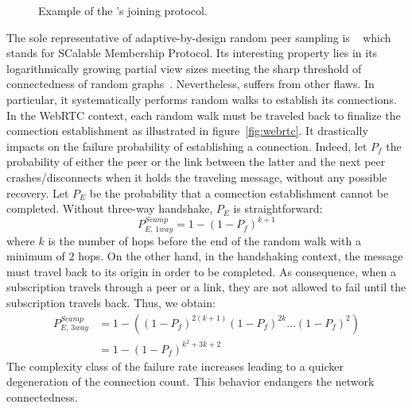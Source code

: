\begin{figure*}
  \centering
  \hspace{8pt}
  \hspace{8pt}
  \caption{\label{fig:joiningexample}Example of the \SPRAY's joining
    protocol.}
\end{figure*}


The sole representative of adaptive-by-design random peer sampling is
\SCAMP~\cite{ganesh2001scamp,ganesh2003peer} which stands for
SCalable Membership Protocol. Its interesting property lies in its
logarithmically growing partial view sizes meeting the sharp threshold
of connectedness of random
graphs~\cite{erdos1959random}. Nevertheless, \SCAMP suffers from
other flaws. In particular, it systematically performs random walks to
establish its connections. In the WebRTC context, each random walk
must be traveled back to finalize the connection establishment as
illustrated in figure~\ref{fig:webrtc}. It drastically impacts on the
\SCAMP failure probability of establishing a connection. Indeed, let
$P_f$ the probability of either the peer or the link between the
latter and the next peer crashes/disconnects when it holds the
traveling message, without any possible recovery. Let $P_E$ be the
probability that a connection establishment cannot be
completed. Without three-way handshake, $P_E$ is straightforward:
\begin{equation} P_{E,\,1way}^{Scamp}=1-(1- P_f)^{k+1} \end{equation} where $k$
is the number of hops before the end of the random walk with a minimum of $2$
hops. On the other hand, in the handshaking context, the message must travel
back to its origin in order to be completed. As consequence, when a
subscription travels through a peer or a link, they are not allowed to fail
until the subscription travels back. Thus, we obtain:
\begin{align} P_{E,\,3way}^{Scamp} &=1 - ((1-P_f)^{2(k+1)} (1-P_f)^{2k}
                                     \ldots (1-P_f)^2) \nonumber \\
                                   &=1-(1-P_f)^{k^2+3k+2}
\end{align}
The complexity class of the \SCAMP failure rate increases leading to a quicker
degeneration of the connection count. This behavior endangers the network
connectedness.

